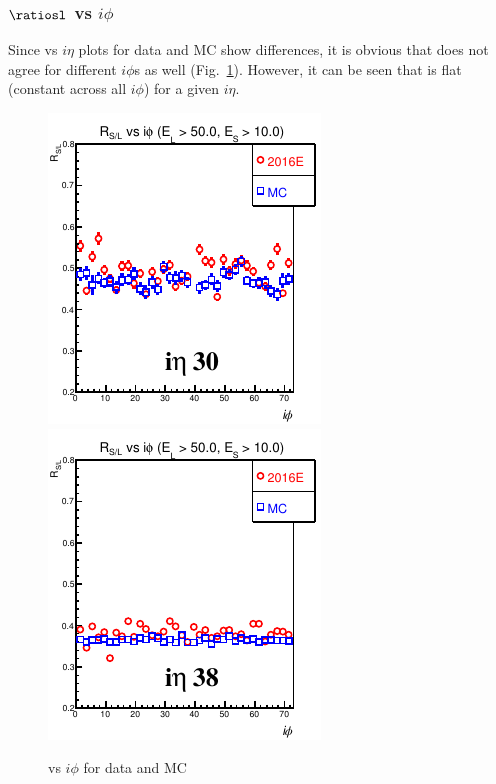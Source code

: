 \subsubsection{$ \ratiosl$ vs $i\phi$}
Since \ratiosl vs $i\eta$ plots for data and MC show differences, it is obvious that \ratiosl does not agree for different $i\phi$s as well (Fig.~\ref{fig:RatioVsIphiDataMC}). However, it can be seen that \ratiosl is flat (constant across all $i\phi$) for a given $i\eta$.
\begin{figure}[h!]
\centering
\includegraphics[width=0.45\linewidth]{../Figures/Chap2/ImageFiles_HF/Ratio/DataMC/ieta30_E1E2Cut3Ietaiphi}
\includegraphics[width=0.45\linewidth]{../Figures/Chap2/ImageFiles_HF/Ratio/DataMC/ieta38_E1E2Cut3Ietaiphi}
\caption{\ratiosl vs $i\phi$ for data and MC}
\label{fig:RatioVsIphiDataMC}
\end{figure}

